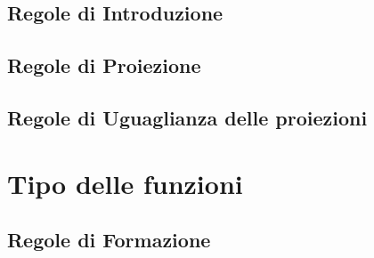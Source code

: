\subsection{Regole di Introduzione}
\begin{prooftree}
\end{prooftree}

\subsection{Regole di Proiezione}
\begin{prooftree}
\end{prooftree}
\begin{prooftree}
\end{prooftree}

\subsection{Regole di Uguaglianza delle proiezioni}
\begin{prooftree}
\end{prooftree}
\begin{prooftree}
\end{prooftree}
\newpage

\section{Tipo delle funzioni}

\subsection{Regole di Formazione}
\begin{prooftree}
\end{prooftree}

